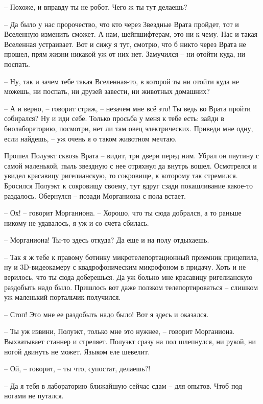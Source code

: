 \documentclass[ebook,oneside,final,openright]{memoir}
\begin{document}
– Похоже, и вправду ты не робот. Чего ж ты тут делаешь? \par
– Да было у нас пророчество, что кто через Звездные Врата пройдет, тот и Вселенную изменить сможет. А нам, шейпшифтерам, это ни к чему. Нас и такая Вселенная устраивает. Вот и сижу я тут, смотрю, что б никто через Врата не прошел, прям жизни никакой уж от них нет. Замучился – ни отойти куда, ни поспать. \par
– Ну, так и зачем тебе такая Вселенная-то, в которой ты ни отойти куда не можешь, ни поспать, ни друзей завести, ни животных домашних? \par
– А и верно, – говорит страж, – незачем мне всё это! Ты ведь во Врата пройти собирался? Ну и иди себе. Только просьба у меня к тебе есть: зайди в биолабораторию, посмотри, нет ли там овец электрических. Приведи мне одну, если найдешь, – уж очень я о таком животном мечтаю.\par
\par
\par
Прошел Полуэкт сквозь Врата – видит, три двери перед ним. Убрал он паутину с самой маленькой, пыль звездную с нее отряхнул да внутрь вошел. Осмотрелся и увидел красавицу ригелианскую, то сокровище, к которому так стремился. Бросился Полуэкт к сокровищу своему, тут вдруг сзади покашливание какое-то раздалось. Обернулся – позади Морганиона с пола встает.\par
– Ох! – говорит Морганиона. – Хорошо, что ты сюда добрался, а то раньше никому не удавалось, я уж и со счета сбилась.\par
– Морганиона! Ты-то здесь откуда? Да еще и на полу отдыхаешь.\par
– Так я ж тебе к правому ботинку микротелепортационный приемник прицепила, ну и 3D-видеокамеру с квадрофоническим микрофоном в придачу. Хоть и не верилось, что ты сюда доберешься. Да уж больно мне красавицу ригелианскую раздобыть надо было. Пришлось вот даже ползком телепортироваться – слишком уж маленький портальчик получился.\par
– Стоп! Это мне ее раздобыть надо было! Вот я здесь и оказался.\par
– Ты уж извини, Полуэкт, только мне это нужнее, – говорит Морганиона. Выхватывает станнер и стреляет. Полуэкт сразу на пол шлепнулся, ни рукой, ни ногой двинуть не может. Языком еле шевелит.\par
– Ой, – говорит, – ты что, супостат, делаешь?!\par
– Да я тебя в лабораторию ближайшую сейчас сдам – для опытов. Чтоб под ногами не путался.\par
\end{document}
